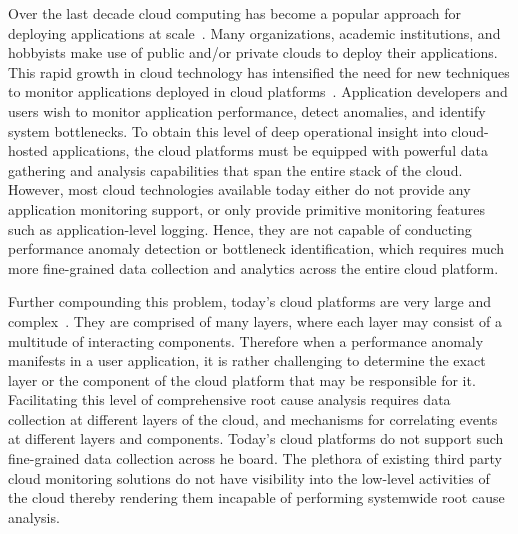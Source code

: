 Over the last decade cloud computing has become a popular approach for deploying
applications at scale~\cite{Antonopoulos:2010:CCP:1855007,Pinheiro:2014:ACC:2618168.2618188}. 
Many organizations, academic institutions, and hobbyists make use of public
and/or private clouds to deploy their applications.
This rapid growth in cloud technology has intensified the need 
for new techniques to
monitor applications deployed in cloud platforms~\cite{DaCunhaRodrigues:2016:MCC:2851613.2851619}. 
Application developers and users wish to monitor application performance, detect 
anomalies, and identify system bottlenecks. To obtain this level of deep operational insight into
cloud-hosted applications, the cloud platforms must be equipped with powerful
data gathering and analysis capabilities that span the entire stack of the cloud. 
However, most cloud technologies available
today either do not provide any application monitoring support, or only provide primitive
monitoring features such as application-level logging. Hence, they are not capable of conducting
performance anomaly detection or bottleneck identification, which requires much more fine-grained
data collection and analytics across the entire cloud platform.

Further compounding this problem, today's cloud platforms are very 
large and complex~\cite{DaCunhaRodrigues:2016:MCC:2851613.2851619,Ibidunmoye:2015:PAD:2808687.2791120}. They are
comprised of many layers, where each layer may consist of a multitude of interacting components.
Therefore when a performance anomaly manifests in a user application, it is rather challenging 
to determine the exact layer or the component of the cloud platform that may be responsible for it. 
Facilitating this level of comprehensive root cause analysis requires
data collection at different layers of the cloud, and mechanisms for correlating events at
different layers and components. Today's cloud platforms do not support such fine-grained
data collection across he board. The plethora of existing third party cloud monitoring solutions
do not have visibility into the low-level activities of the cloud thereby rendering them incapable
of performing systemwide root cause analysis.

